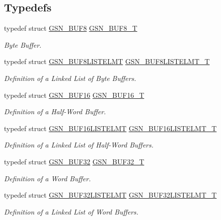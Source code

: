 \subsection*{Typedefs}
\begin{DoxyCompactItemize}
\item 
typedef struct \hyperlink{a00033}{GSN\_\-BUF8} \hyperlink{a00654_ga5ae3d391ff074ccd3582b1ece95b3424}{GSN\_\-BUF8\_\-T}
\begin{DoxyCompactList}\small\item\em Byte Buffer. \end{DoxyCompactList}\item 
typedef struct \hyperlink{a00034}{GSN\_\-BUF8LISTELMT} \hyperlink{a00654_ga99a362860e397ed25f4481f88b5b792e}{GSN\_\-BUF8LISTELMT\_\-T}
\begin{DoxyCompactList}\small\item\em Definition of a Linked List of Byte Buffers. \end{DoxyCompactList}\item 
typedef struct \hyperlink{a00029}{GSN\_\-BUF16} \hyperlink{a00654_ga4fdddff0bde69bd592327bf3914b4c39}{GSN\_\-BUF16\_\-T}
\begin{DoxyCompactList}\small\item\em Definition of a Half-\/Word Buffer. \end{DoxyCompactList}\item 
typedef struct \hyperlink{a00030}{GSN\_\-BUF16LISTELMT} \hyperlink{a00654_ga6635dc0a6b962b379e55c1fff1ab6298}{GSN\_\-BUF16LISTELMT\_\-T}
\begin{DoxyCompactList}\small\item\em Definition of a Linked List of Half-\/Word Buffers. \end{DoxyCompactList}\item 
typedef struct \hyperlink{a00031}{GSN\_\-BUF32} \hyperlink{a00654_ga8a61cbeed769180229c38ff66d0d820c}{GSN\_\-BUF32\_\-T}
\begin{DoxyCompactList}\small\item\em Definition of a Word Buffer. \end{DoxyCompactList}\item 
typedef struct \hyperlink{a00032}{GSN\_\-BUF32LISTELMT} \hyperlink{a00654_ga885b6249f0604d742fc832fa1c221d5e}{GSN\_\-BUF32LISTELMT\_\-T}
\begin{DoxyCompactList}\small\item\em Definition of a Linked List of Word Buffers. \end{DoxyCompactList}\end{DoxyCompactItemize}
